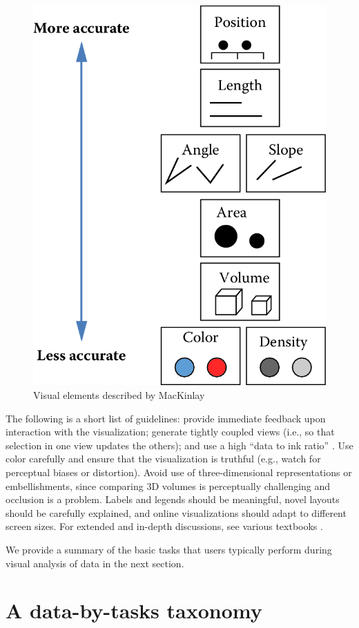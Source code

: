 \documentclass[]{krantz}
\begin{document}
\begin{figure}

{\centering \includegraphics[width=0.5\linewidth]{ChapterViz/figures/fig9-4} 

}

\caption{Visual elements described by MacKinlay \citep{mackinlay1986automating}}\label{fig:fig9-4}
\end{figure}

The following is a short list of guidelines: provide immediate feedback
upon interaction with the visualization; generate tightly coupled views
(i.e., so that selection in one view updates the others); and use a high
``data to ink ratio'' \citep{edward2001visual}. Use color carefully and
ensure that the visualization is truthful (e.g., watch for perceptual
biases or distortion). Avoid use of three-dimensional representations or
embellishments, since comparing 3D volumes is perceptually challenging
and occlusion is a problem. Labels and legends should be meaningful,
novel layouts should be carefully explained, and online visualizations
should adapt to different screen sizes. For extended and in-depth
discussions, see various textbooks
\citep{few2009now, kirk2012data, ward2010interactive, munzner2014visualization, edward2001visual, edward2006beauty}.

We provide a summary of the basic tasks that users typically perform
during visual analysis of data in the next section.

\section{A data-by-tasks taxonomy}\label{sec:viz-3}
\end{document}
